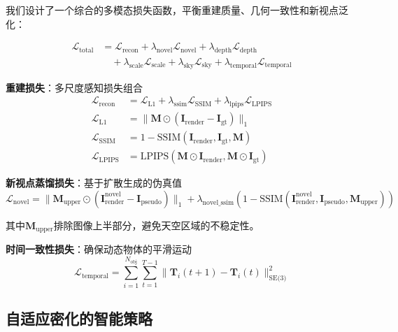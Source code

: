 我们设计了一个综合的多模态损失函数，平衡重建质量、几何一致性和新视点泛化：

\begin{align}
\mathcal{L}_{\text{total}} &= \mathcal{L}_{\text{recon}} + \lambda_{\text{novel}} \mathcal{L}_{\text{novel}} + \lambda_{\text{depth}} \mathcal{L}_{\text{depth}} \\
&\quad + \lambda_{\text{scale}} \mathcal{L}_{\text{scale}} + \lambda_{\text{sky}} \mathcal{L}_{\text{sky}} + \lambda_{\text{temporal}} \mathcal{L}_{\text{temporal}}
\label{eq:comprehensive_loss}
\end{align}

\textbf{重建损失}：多尺度感知损失组合
\begin{align}
\mathcal{L}_{\text{recon}} &= \mathcal{L}_{\text{L1}} + \lambda_{\text{ssim}} \mathcal{L}_{\text{SSIM}} + \lambda_{\text{lpips}} \mathcal{L}_{\text{LPIPS}} \\
\mathcal{L}_{\text{L1}} &= \|\mathbf{M} \odot (\mathbf{I}_{\text{render}} - \mathbf{I}_{\text{gt}})\|_1 \\
\mathcal{L}_{\text{SSIM}} &= 1 - \text{SSIM}(\mathbf{I}_{\text{render}}, \mathbf{I}_{\text{gt}}, \mathbf{M}) \\
\mathcal{L}_{\text{LPIPS}} &= \text{LPIPS}(\mathbf{M} \odot \mathbf{I}_{\text{render}}, \mathbf{M} \odot \mathbf{I}_{\text{gt}})
\label{eq:reconstruction_loss_detailed}
\end{align}

\textbf{新视点蒸馏损失}：基于扩散生成的伪真值
\begin{equation}
\mathcal{L}_{\text{novel}} = \|\mathbf{M}_{\text{upper}} \odot (\mathbf{I}_{\text{render}}^{\text{novel}} - \mathbf{I}_{\text{pseudo}})\|_1 + \lambda_{\text{novel\_ssim}} (1 - \text{SSIM}(\mathbf{I}_{\text{render}}^{\text{novel}}, \mathbf{I}_{\text{pseudo}}, \mathbf{M}_{\text{upper}}))
\label{eq:novel_distillation_loss}
\end{equation}

其中$\mathbf{M}_{\text{upper}}$排除图像上半部分，避免天空区域的不稳定性。

\textbf{时间一致性损失}：确保动态物体的平滑运动
\begin{equation}
\mathcal{L}_{\text{temporal}} = \sum_{i=1}^{N_{\text{obj}}} \sum_{t=1}^{T-1} \|\mathbf{T}_i(t+1) - \mathbf{T}_i(t)\|_{\text{SE(3)}}^2
\label{eq:temporal_consistency}
\end{equation}

\subsection{自适应密化的智能策略}

